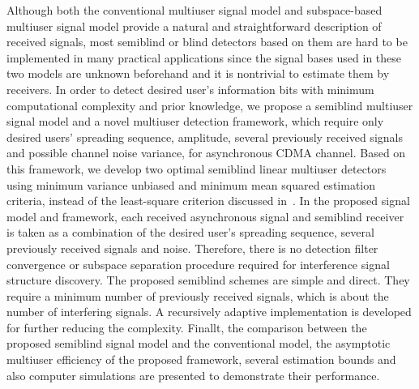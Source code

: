 \documentclass[a4paper,10pt,fleqn, twocolumn]{IEEETran}
\begin{document}
Although both the conventional multiuser signal model and
subspace-based multiuser signal model provide a natural and
straightforward description of received signals, most semiblind or
blind detectors based on them are hard to be implemented in many
practical applications since the signal bases used in these two
models are unknown beforehand and it is nontrivial to estimate
them by receivers. In order to detect desired user's information
bits with minimum computational complexity and prior knowledge, we
propose a semiblind multiuser signal model and a novel multiuser
detection framework, which require only desired users' spreading
sequence, amplitude, several previously received signals and
possible channel noise variance, for asynchronous CDMA channel.
Based on this framework, we develop two optimal semiblind linear
multiuser detectors using minimum variance unbiased and minimum
mean squared estimation criteria, instead of the least-square
criterion discussed in~\cite{Wang03d,Wang03e}. In the proposed
signal model and framework, each received asynchronous signal and
semiblind receiver is taken as a combination of the desired user's
spreading sequence, several previously received signals and noise.
Therefore, there is no detection filter convergence or subspace
separation procedure required for interference signal structure
discovery. The proposed semiblind schemes are simple and direct.
They require a minimum number of previously received signals,
which is about the number of interfering signals. A recursively
adaptive implementation is developed for further reducing the
complexity. Finallt, the comparison between the proposed semiblind
signal model and the conventional model, the asymptotic multiuser
efficiency of the proposed framework, several estimation bounds
and also computer simulations are presented to demonstrate their
performance.
\end{document}
